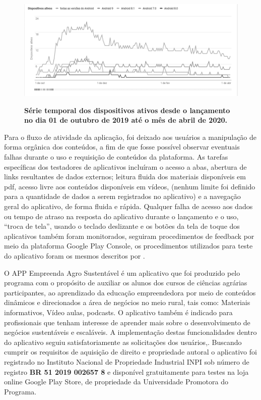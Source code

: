\begin{figure}[H]
\caption{\textbf{Série temporal dos dispositivos ativos desde o lançamento no dia 01 de outubro de 2019 até o mês de abril de 2020.}}
\centering
\includegraphics[scale=0.6]{Imagens/dispositivos_instalados.png}
\label{figura_43}
\end{figure}

Para o fluxo de atividade da aplicação, foi deixado aos usuários a manipulação de forma orgânica dos conteúdos, a fim de que fosse possível observar eventuais falhas durante o uso e requisição de conteúdos da plataforma. 
As tarefas específicas dos testadores de aplicativos incluíram o acesso a abas, abertura de links resultantes de dados externos; leitura fluida dos materiais disponíveis em pdf, acesso livre aos conteúdos disponíveis em vídeos, (nenhum limite foi definido para a quantidade de dados a serem registrados no aplicativo) e a navegação geral do aplicativo, de forma fluida e rápida.
 Qualquer falha de acesso aos dados ou tempo de atraso na resposta do aplicativo durante o lançamento e o uso, “troca de tela”, usando o teclado deslizante e os botões da tela de toque dos aplicativos também foram monitorados, seguiram procedimentos de feedback por meio da plataforma Google Play Console, os procedimentos utilizados para teste do aplicativo foram os mesmos descritos por \cite{adu_development_2020}.

O APP Empreenda Agro Sustentável é um aplicativo que foi produzido pelo programa com o propósito de auxiliar os alunos dos cursos de ciências agrárias participantes, ao aprendizado da educação empreendedora por meio de conteúdos dinâmicos e direcionados a área de negócios no meio rural, tais como: Materiais informativos, Vídeo aulas, podcasts.
O aplicativo também é indicado para profissionais que tenham interesse de aprender mais sobre o desenvolvimento de negócios sustentáveis e escaláveis.
A implementação destas funcionalidades dentro do aplicativo seguiu satisfatoriamente as solicitações dos usuários,.
Buscando cumprir os requisitos de aquisição de direito e propriedade autoral o aplicativo foi registrado no Instituto Nacional de Propriedade Industrial INPI sob número de registro \textbf{BR 51 2019 002657 8} e disponível gratuitamente para testes na loja online Google Play Store, de propriedade da Universidade Promotora do Programa.



